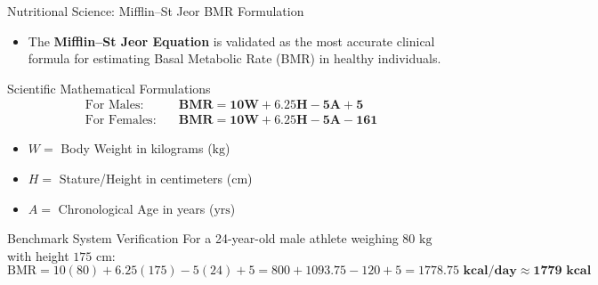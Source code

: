 \documentclass[aspectratio=169,10pt]{beamer}
\begin{document}
\begin{frame}{Nutritional Science: Mifflin--St Jeor BMR Formulation}
  \begin{itemize}
    \item The \textbf{Mifflin--St Jeor Equation} is validated as the most accurate clinical formula for estimating Basal Metabolic Rate (BMR) in healthy individuals.
  \end{itemize}
  \begin{block}{Scientific Mathematical Formulations}
    \begin{align*}
      \text{For Males:} \quad & \mathbf{BMR = 10W + 6.25H - 5A + 5} \\
      \text{For Females:} \quad & \mathbf{BMR = 10W + 6.25H - 5A - 161}
    \end{align*}
    \vspace{-0.3cm}
    \begin{itemize}
      \item $W =$ Body Weight in kilograms ($\text{kg}$)
      \item $H =$ Stature/Height in centimeters ($\text{cm}$)
      \item $A =$ Chronological Age in years ($\text{yrs}$)
    \end{itemize}
  \end{block}
  \begin{exampleblock}{Benchmark System Verification}
    For a 24-year-old male athlete weighing $80\text{ kg}$ with height $175\text{ cm}$:
    \[
      \text{BMR} = 10(80) + 6.25(175) - 5(24) + 5 = 800 + 1093.75 - 120 + 5 = \mathbf{1778.75\text{ kcal/day}} \approx \mathbf{1779\text{ kcal}}
    \]
  \end{exampleblock}
\end{frame}
\end{document}
